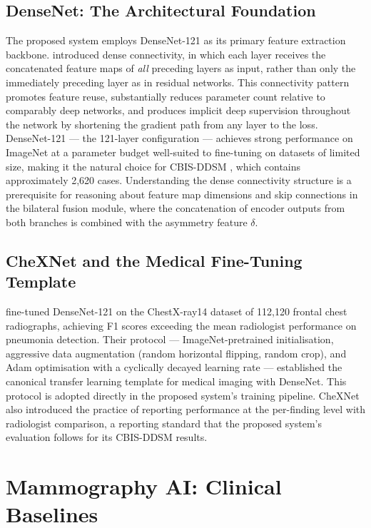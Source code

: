 \documentclass[12pt, a4paper]{article}
\begin{document}
\subsection{DenseNet: The Architectural Foundation}

The proposed system employs DenseNet-121 as its primary feature extraction
backbone.
\textcite{Huang2017} introduced dense connectivity, in which each layer
receives the concatenated feature maps of \textit{all} preceding layers as
input, rather than only the immediately preceding layer as in residual
networks.
This connectivity pattern promotes feature reuse, substantially reduces
parameter count relative to comparably deep networks, and produces implicit
deep supervision throughout the network by shortening the gradient path from
any layer to the loss.
DenseNet-121 --- the 121-layer configuration --- achieves strong performance
on ImageNet at a parameter budget well-suited to fine-tuning on datasets of
limited size, making it the natural choice for CBIS-DDSM
\parencite{Lee2017}, which contains approximately 2,620 cases.
Understanding the dense connectivity structure is a prerequisite for
reasoning about feature map dimensions and skip connections in the bilateral
fusion module, where the concatenation of encoder outputs from both branches
is combined with the asymmetry feature $\delta$.

\subsection{CheXNet and the Medical Fine-Tuning Template}

\textcite{Rajpurkar2017} fine-tuned DenseNet-121 on the ChestX-ray14 dataset
of 112,120 frontal chest radiographs, achieving F1 scores exceeding the
mean radiologist performance on pneumonia detection.
Their protocol --- ImageNet-pretrained initialisation, aggressive data
augmentation (random horizontal flipping, random crop), and Adam
optimisation with a cyclically decayed learning rate --- established the
canonical transfer learning template for medical imaging with DenseNet.
This protocol is adopted directly in the proposed system's training pipeline.
CheXNet also introduced the practice of reporting performance at the
per-finding level with radiologist comparison, a reporting standard that
the proposed system's evaluation follows for its CBIS-DDSM results.

\section{Mammography AI: Clinical Baselines}
\end{document}
